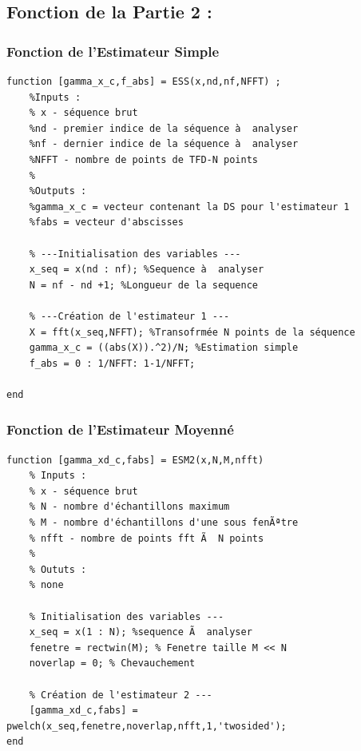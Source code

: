 \documentclass{article}
\begin{document}
\subsection{Fonction de la Partie 2 : }
\subsubsection{Fonction de l'Estimateur Simple }
\begin{verbatim}
function [gamma_x_c,f_abs] = ESS(x,nd,nf,NFFT) ;
    %Inputs : 
    % x - séquence brut 
    %nd - premier indice de la séquence à  analyser
    %nf - dernier indice de la séquence à  analyser
    %NFFT - nombre de points de TFD-N points
    %
    %Outputs : 
    %gamma_x_c = vecteur contenant la DS pour l'estimateur 1 
    %fabs = vecteur d'abscisses 
    
    % ---Initialisation des variables ---
    x_seq = x(nd : nf); %Sequence à  analyser
    N = nf - nd +1; %Longueur de la sequence
    
    % ---Création de l'estimateur 1 ---
    X = fft(x_seq,NFFT); %Transofrmée N points de la séquence  
    gamma_x_c = ((abs(X)).^2)/N; %Estimation simple
    f_abs = 0 : 1/NFFT: 1-1/NFFT;

end
\end{verbatim}
\newpage
\subsubsection{Fonction de l'Estimateur Moyenné }
\begin{verbatim}
function [gamma_xd_c,fabs] = ESM2(x,N,M,nfft)
    % Inputs :
    % x - séquence brut 
    % N - nombre d'échantillons maximum
    % M - nombre d'échantillons d'une sous fenÃªtre 
    % nfft - nombre de points fft Ã  N points
    % 
    % Oututs :
    % none 
    
    % Initialisation des variables ---
    x_seq = x(1 : N); %sequence Ã  analyser
    fenetre = rectwin(M); % Fenetre taille M << N
    noverlap = 0; % Chevauchement 
    
    % Création de l'estimateur 2 ---
    [gamma_xd_c,fabs] = pwelch(x_seq,fenetre,noverlap,nfft,1,'twosided');
end
\end{verbatim}
\newpage
\end{document}
